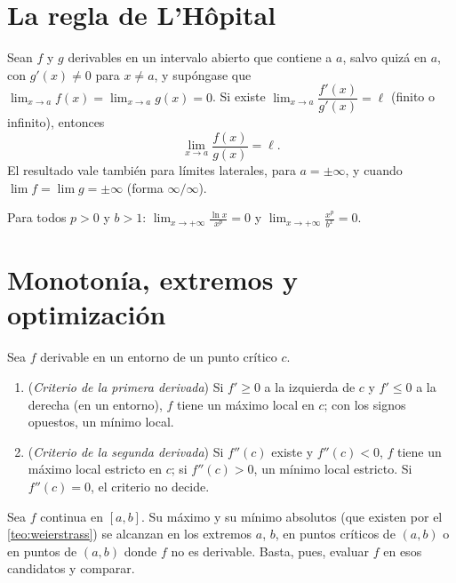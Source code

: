 \section{La regla de L'Hôpital}

\begin{teorema}\label{teo:lhopital}
Sean $f$ y $g$ derivables en un intervalo abierto que contiene a $a$, salvo quizá en $a$, con $g'(x)\ne0$ para $x\ne a$, y supóngase que $\lim_{x\to a}f(x)=\lim_{x\to a}g(x)=0$. Si existe $\lim_{x\to a}\dfrac{f'(x)}{g'(x)}=\ell$ (finito o infinito), entonces
\[
\lim_{x\to a}\frac{f(x)}{g(x)}=\ell.
\]
El resultado vale también para límites laterales, para $a=\pm\infty$, y cuando $\lim f=\lim g=\pm\infty$ (forma $\infty/\infty$).
\end{teorema}

\addtocounter{definicion}{1}%

\begin{proposicion}\label{prop:crecimientos}
Para todos $p>0$ y $b>1$: $\displaystyle\lim_{x\to+\infty}\frac{\ln x}{x^{p}}=0$ y $\displaystyle\lim_{x\to+\infty}\frac{x^{p}}{b^{x}}=0$.
\end{proposicion}

\section{Monotonía, extremos y optimización}

\begin{proposicion}\label{prop:criterios}
Sea $f$ derivable en un entorno de un punto crítico $c$.
\begin{enumerate}
  \item (\emph{Criterio de la primera derivada}) Si $f'\ge0$ a la izquierda de $c$ y $f'\le0$ a la derecha (en un entorno), $f$ tiene un máximo local en $c$; con los signos opuestos, un mínimo local.
  \item (\emph{Criterio de la segunda derivada}) Si $f''(c)$ existe y $f''(c)<0$, $f$ tiene un máximo local estricto en $c$; si $f''(c)>0$, un mínimo local estricto. Si $f''(c)=0$, el criterio no decide.
\end{enumerate}
\end{proposicion}

\begin{proposicion}\label{prop:intervalo-cerrado}
Sea $f$ continua en $[a,b]$. Su máximo y su mínimo absolutos (que existen por el \cref{teo:weierstrass}) se alcanzan en los extremos $a$, $b$, en puntos críticos de $(a,b)$ o en puntos de $(a,b)$ donde $f$ no es derivable. Basta, pues, evaluar $f$ en esos candidatos y comparar.
\end{proposicion}


